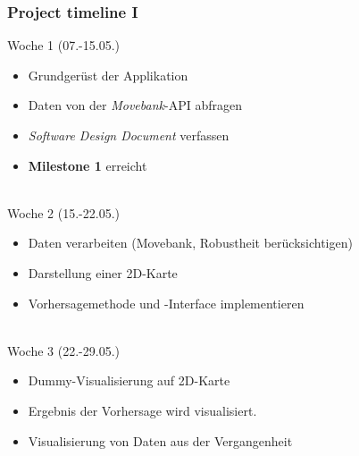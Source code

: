 \documentclass[xcolor=dvipsnames]{beamer}
\begin{document}
\begin{frame}
	\frametitle{\textbf{Project timeline I}}
	\Large{Woche 1 (07.-15.05.)}
	\normalsize
	~\\
	\begin{itemize}
		\item \color{Green} Grundgerüst der Applikation
		\item \color{Green} Daten von der \textit{Movebank}-API abfragen
		\item \color{Green} \textit{Software Design Document} verfassen
		\item \color{Green} \textbf{Milestone 1} erreicht
	\end{itemize}
	~\\
	\Large{Woche 2 (15.-22.05.)}
	\normalsize		
	~\\
	\begin{itemize}
		\item \color{Green} Daten verarbeiten (Movebank, Robustheit berücksichtigen) 
		\item \color{Green} Darstellung einer 2D-Karte \\
		\item \color{Green} Vorhersagemethode und -Interface implementieren
	\end{itemize}
	~\\		
	\Large{Woche 3 (22.-29.05.)}
	\normalsize
	~\\
	\begin{itemize}
		\item \color{Green} Dummy-Visualisierung auf 2D-Karte \\
		\item \color{Green} Ergebnis der Vorhersage wird visualisiert. \\
		\item \color{Green} Visualisierung von Daten aus der Vergangenheit
	\end{itemize}	
\end{frame}
\end{document}
